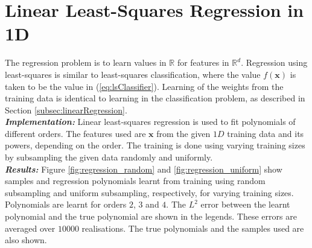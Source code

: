 \documentclass[12pt, a4 paper]{article}
\newcommand{\bx}{\mathbf{x}}
\newcommand{\rr}{\mathbb{R}}
\begin{document}

\section{Linear Least-Squares Regression in 1D}
\label{sec:linearRegression}

The regression problem is to learn values in $\rr$ for features in $\rr^{d}$. Regression using least-squares is similar to least-squares classification, where the value $f(\bx)$ is taken to be the value in (\ref{eq:lsClassifier}). Learning of the weights from the training data is identical to learning in the classification problem, as described in Section \ref{subsec:linearRegression}. \\

{\it \bfseries Implementation:} Linear least-squares regression is used to fit polynomials of different orders. The features used are $\bx$ from the given $1D$ training data and its powers, depending on the order. The training is done using varying training sizes by subsampling the given data randomly and uniformly. \\

{\it \bfseries Results:} Figure \ref{fig:regression_random} and \ref{fig:regression_uniform} show samples and regression polynomials learnt from training using random subsampling and uniform subsampling, respectively, for varying training sizes. Polynomials are learnt for orders $2$, $3$ and $4$. The $L^{2}$ error between the learnt polynomial and the true polynomial are shown in the legends. These errors are averaged over $10000$ realisations. The true polynomials and the samples used are also shown. \\
\end{document}
